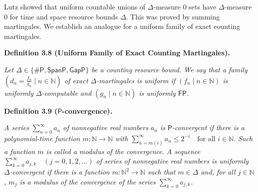 


Lutz showed that uniform countable unions of $\Delta$-measure 0 sets have $\Delta$-measure 0 for time and space resource bounds $\Delta$. This was proved by summing martingales. We establish an analogue for a uniform family of exact counting martingales.\par





\par\medskip\noindent\textbf{
\textbf{Definition 3.8}\textbf{ }(Uniform Family of Exact Counting Martingales)\textbf{.}
}\par



\emph{Let $\Delta\in\{{\mathsf{\#}\mathsf{P}},\mathsf{SpanP},\allowbreak\mathsf{GapP}\}$ be a counting resource bound.
We say that a family $\left(d_{n}=\frac{f_{n}}{g_{n}}\mid n\in\mathbb{N}\right)$ of exact $\Delta$-martingales is uniform if $(f_{n}\mid n\in\mathbb{N})$ is uniformly $\Delta$-computable and $(g_{n}\mid n\in\mathbb{N})$ is uniformly $\mathsf{FP}$.}\par







\par\medskip\noindent\textbf{
\textbf{Definition 3.9}\textbf{ }($\mathsf{P}$-convergence)\textbf{.}
}\par



\emph{A series $\sum_{n=0}^{\infty}a_{n}$ of nonnegative real numbers $a_{n}$ is $\mathsf{P}$-convergent if there is a polynomial-time function $m:\mathbb{N}\to\mathbb{N}$ with
$\sum_{n=m(i)}^{\infty}a_{n}\leq 2^{-i}\quad\text{for all }i\in\mathbb{N}.$
Such a function $m$ is called a modulus of the convergence.
A sequence
$\sum_{k=0}^{\infty}a_{j,k}\quad(j=0,1,2,\ldots)$
of series of nonnegative real numbers is uniformly $\Delta$-convergent if there is a function $m:\mathbb{N}^{2}\to\mathbb{N}$ such that $m\in\Delta$ and, for all $j\in\mathbb{N}$, $m_{j}$ is a modulus of the convergence of the series $\sum_{k=0}^{\infty}a_{j,k}$.}\par








